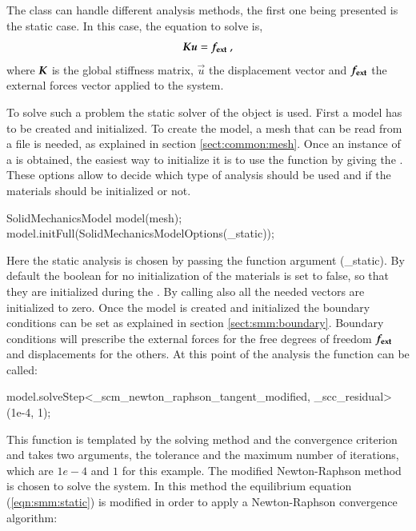 The  class can handle different analysis
methods, the first one being presented is the static case.  In this
case, the equation to solve is,
\begin{equation}\label{eqn:smm:static} \boldsymbol{K} \boldsymbol{u} =
\boldsymbol{f_{{\mathrm{ext}}}}~,
\end{equation} where $\boldsymbol{K}$ is the global stiffness matrix,
$\vec{u}$ the displacement vector and $\boldsymbol{f_{{\mathrm{ext}}}}$ the
external forces vector applied to the system.


To solve such a problem the static solver of the
 object is used.
First a model has to be created and initialized.  To create the model,
a mesh that can be read from a file is needed, as explained in section
\ref{sect:common:mesh}.  Once an instance of a
 is obtained, the easiest way to initialize
it is to use the 
function by giving the . These
options allow to decide which type of analysis should be used and if
the materials should be initialized or not.
\begin{cpp} SolidMechanicsModel model(mesh);
model.initFull(SolidMechanicsModelOptions(_static));
\end{cpp} Here the static analysis is chosen by passing the function
argument (\_static). By default the boolean for no initialization of
the materials is set to false, so that they are initialized during the
. By calling  also all the needed
vectors are initialized to zero.  Once the model is created and
initialized the boundary conditions can be set as explained in section
\ref{sect:smm:boundary}.  Boundary conditions will prescribe the
external forces for the free degrees of freedom $\boldsymbol{f_{{\mathrm{ext}}}}$
and displacements for the others.  At this point of the analysis the
function  can be
called:
\begin{cpp} model.solveStep<_scm_newton_raphson_tangent_modified,
_scc_residual>(1e-4, 1);
\end{cpp} This function is templated by the solving method and the
convergence criterion and takes two arguments, the tolerance and the
maximum number of iterations, which are $1e-4$ and $1$ for this
example. The modified Newton-Raphson method is chosen to solve the
system. In this method the equilibrium equation (\ref{eqn:smm:static})
is modified in order to apply a Newton-Raphson convergence algorithm:

